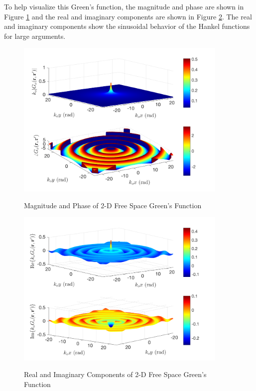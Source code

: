 To help visualize this Green's function, the magnitude and phase are shown in Figure \ref{gf_fig:3} and the real and imaginary components are shown in Figure \ref{gf_fig:4}. The real and imaginary components show the sinusoidal behavior of the Hankel functions for large arguments.

\begin{figure}[ht]
\begin{center}
\includegraphics[width=4in]{../media/2d_fs_gf_mag.png}
\end{center}
\renewcommand{\baselinestretch}{1}
\small\normalsize
\begin{quote}
\caption[Magnitude and Phase of 2-D Free Space Green's Function]{Magnitude and Phase of 2-D Free Space Green's Function \label{gf_fig:3}}
\end{quote}
\end{figure} 
\renewcommand{\baselinestretch}{2}
\small\normalsize

\begin{figure}[ht]
\begin{center}
\includegraphics[width=4in]{../media/2d_fs_gf_re_im.png}
\end{center}
\renewcommand{\baselinestretch}{1}
\small\normalsize
\begin{quote}
\caption[Real and Imaginary Components of 2-D Free Space Green's Function]{Real and Imaginary Components of 2-D Free Space Green's Function \label{gf_fig:4}}
\end{quote}
\end{figure} 
\renewcommand{\baselinestretch}{2}
\small\normalsize

